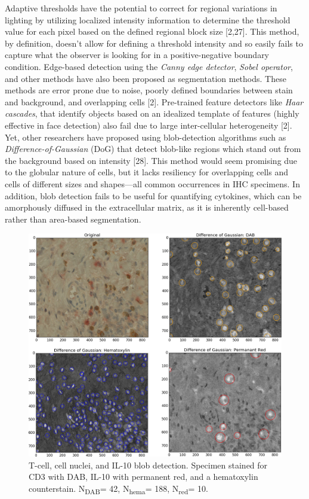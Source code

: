 \documentclass[12pt]{article}
\begin{document}
Adaptive thresholds have the potential to correct for regional variations in lighting by utilizing localized intensity information to determine the threshold value for each pixel based on the defined regional block size [2,27]. This method, by definition, doesn’t allow for defining a threshold intensity and so easily fails to capture what the observer is looking for in a positive-negative boundary condition. Edge-based detection using the \textit{Canny edge detector}, \textit{Sobel operator}, and other methods have also been proposed as segmentation methods. These methods are error prone due to noise, poorly defined boundaries between stain and background, and overlapping cells [2]. Pre-trained feature detectors like \textit{Haar cascades}, that identify objects based on an idealized template of features (highly effective in face detection) also fail due to large inter-cellular heterogeneity [2]. Yet, other researchers have proposed using blob-detection algorithms such as \textit{Difference-of-Gaussian} (DoG) that detect blob-like regions which stand out from the background based on intensity [28]. This method would seem promising due to the globular nature of cells, but it lacks resiliency for overlapping cells and cells of different sizes and shapes---all common occurrences in IHC specimens. In addition, blob detection fails to be useful for quantifying cytokines, which can be amorphously diffused in the extracellular matrix, as it is inherently cell-based rather than area-based segmentation.

\begin{figure}[H]
  \includegraphics[width=\linewidth]{BlobDetect3.png}
  \caption{T-cell, cell nuclei, and IL-10 blob detection. Specimen stained for CD3 with DAB, IL-10 with permanent red, and a hematoxylin counterstain. N\textsubscript{DAB}= 42, N\textsubscript{hema}= 188, N\textsubscript{red}= 10.}
  \label{fig:BlobDetect3}
\end{figure}
\end{document}
